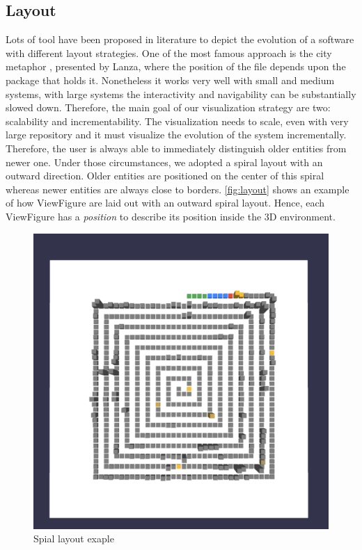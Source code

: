 \subsection*{Layout}
Lots of tool have been proposed in literature to depict the evolution of a software with different layout strategies. 
One of the most famous approach is the city metaphor \cite{Wettel2007}, presented by Lanza, where the position of the file depends upon the package that holds it. 
Nonetheless it works very well with small and medium systems, with large systems the interactivity and navigability can be substantially slowed down.
\bigbreak
Therefore, the main goal of our visualization strategy are two: scalability and incrementability. The visualization needs to scale, even with very large repository and it must visualize the evolution of the system incrementally. Therefore, the user is always able to immediately distinguish older entities from newer one.
\bigbreak
Under those circumstances, we adopted a spiral layout with an outward direction. Older entities are positioned on the center of this spiral whereas newer entities are always close to borders. 
\autoref{fig:layout} shows an example of how ViewFigure are laid out with an outward spiral layout.
\bigbreak
Hence, each ViewFigure has a \textit{position} to describe its position inside the 3D environment. 

\begin{figure}
    \center
    \includegraphics[width=\textwidth]{Layout.png}
    \caption{Spial layout exaple}
    \label{fig:layout}
\end{figure}

